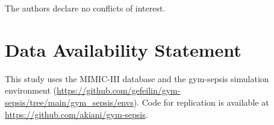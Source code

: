 \documentclass[11pt]{article}
\begin{document}
The authors declare no conflicts of interest.

\section{Data Availability Statement}

This study uses the MIMIC-III database \citep{johnson2016mimic3} and the gym-sepsis simulation environment (\url{https://github.com/gefeilin/gym-sepsis/tree/main/gym_sepsis/envs}). Code for replication is available at \url{https://github.com/akiani/gym-sepsis}.




\end{document}
